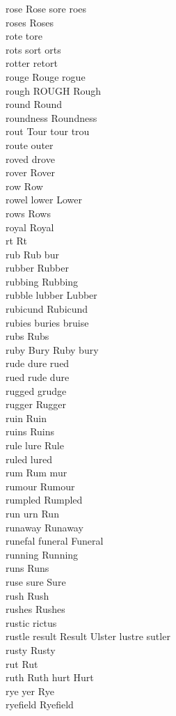 rose Rose sore roes\\
roses Roses\\
rote tore\\
rots sort orts\\
rotter retort\\
rouge Rouge rogue\\
rough ROUGH Rough\\
round Round\\
roundness Roundness\\
rout Tour tour trou\\
route outer\\
roved drove\\
rover Rover\\
row Row\\
rowel lower Lower\\
rows Rows\\
royal Royal\\
rt Rt\\
rub Rub bur\\
rubber Rubber\\
rubbing Rubbing\\
rubble lubber Lubber\\
rubicund Rubicund\\
rubies buries bruise\\
rubs Rubs\\
ruby Bury Ruby bury\\
rude dure rued\\
rued rude dure\\
rugged grudge\\
rugger Rugger\\
ruin Ruin\\
ruins Ruins\\
rule lure Rule\\
ruled lured\\
rum Rum mur\\
rumour Rumour\\
rumpled Rumpled\\
run urn Run\\
runaway Runaway\\
runefal funeral Funeral\\
running Running\\
runs Runs\\
ruse sure Sure\\
rush Rush\\
rushes Rushes\\
rustic rictus\\
rustle result Result Ulster lustre sutler\\
rusty Rusty\\
rut Rut\\
ruth Ruth hurt Hurt\\
rye yer Rye\\
ryefield Ryefield\\

